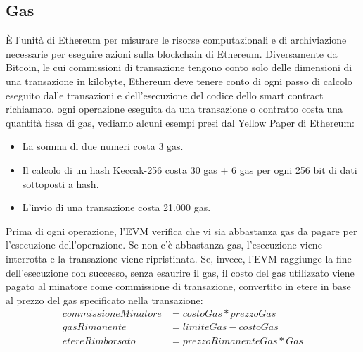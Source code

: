 \subsection*{Gas}
È l'unità di Ethereum per misurare le risorse computazionali e di archiviazione necessarie per eseguire azioni sulla blockchain di Ethereum. Diversamente da Bitcoin, le cui commissioni di transazione tengono conto solo delle dimensioni di una transazione in kilobyte, Ethereum deve tenere conto di ogni passo di calcolo eseguito dalle transazioni e dell'esecuzione del codice dello smart contract richiamato. ogni operazione eseguita da una transazione o contratto costa una quantità fissa di gas, vediamo alcuni esempi presi dal Yellow Paper di Ethereum:
\begin{itemize}
	\item La somma di due numeri costa 3 gas.
	\item Il calcolo di un hash Keccak-256 costa 30 gas + 6 gas per ogni 256 bit di dati sottoposti a hash.
	\item L'invio di una transazione costa 21.000 gas.
\end{itemize}
Prima di ogni operazione, l'EVM verifica che vi sia abbastanza gas da pagare per l'esecuzione dell'operazione. Se non c'è abbastanza gas, l'esecuzione viene interrotta e la transazione viene ripristinata. Se, invece, l'EVM raggiunge la fine dell'esecuzione con successo, senza esaurire il gas, il costo del gas utilizzato viene pagato al minatore come commissione di transazione, convertito in etere in base al prezzo del gas specificato nella transazione:
%
\begin{align*}
commissione Minatore &= costo Gas * prezzo Gas\\
gas Rimanente &= limite Gas - costo Gas\\
etere Rimborsato &= prezzo Rimanente Gas * Gas 
\end{align*}

